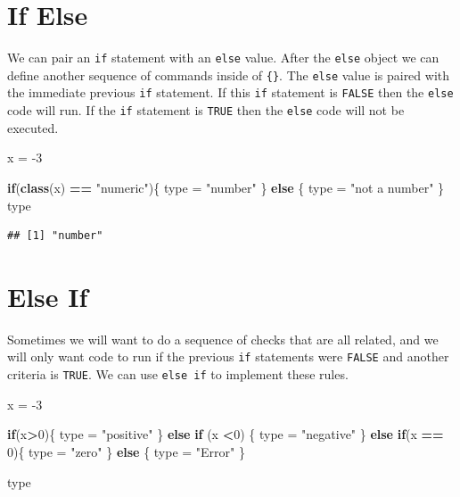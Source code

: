 \documentclass[
]{book}
\newenvironment{Shaded}{\begin{snugshade}}{\end{snugshade}}
\newcommand{\ControlFlowTok}[1]{\textcolor[rgb]{0.13,0.29,0.53}{\textbf{#1}}}
\newcommand{\DecValTok}[1]{\textcolor[rgb]{0.00,0.00,0.81}{#1}}
\newcommand{\KeywordTok}[1]{\textcolor[rgb]{0.13,0.29,0.53}{\textbf{#1}}}
\newcommand{\NormalTok}[1]{#1}
\newcommand{\OperatorTok}[1]{\textcolor[rgb]{0.81,0.36,0.00}{\textbf{#1}}}
\newcommand{\StringTok}[1]{\textcolor[rgb]{0.31,0.60,0.02}{#1}}
\begin{document}
\hypertarget{if-else}{%
\section{If Else}\label{if-else}}

We can pair an \texttt{if} statement with an \texttt{else} value. After the \texttt{else} object we can define another sequence of commands inside of \texttt{\{\}}. The \texttt{else} value is paired with the immediate previous \texttt{if} statement. If this \texttt{if} statement is \texttt{FALSE} then the \texttt{else} code will run. If the \texttt{if} statement is \texttt{TRUE} then the \texttt{else} code will not be executed.

\begin{Shaded}
\begin{Highlighting}[]
\NormalTok{x =}\StringTok{ }\DecValTok{-3}

\ControlFlowTok{if}\NormalTok{(}\KeywordTok{class}\NormalTok{(x) }\OperatorTok{==}\StringTok{ "numeric"}\NormalTok{)\{}
\NormalTok{  type =}\StringTok{ "number"}
\NormalTok{\} }\ControlFlowTok{else}\NormalTok{ \{}
\NormalTok{  type =}\StringTok{ "not a number"}
\NormalTok{\}}
\NormalTok{type}
\end{Highlighting}
\end{Shaded}

\begin{verbatim}
## [1] "number"
\end{verbatim}

\hypertarget{else-if}{%
\section{Else If}\label{else-if}}

Sometimes we will want to do a sequence of checks that are all related, and we will only want code to run if the previous \texttt{if} statements were \texttt{FALSE} and another criteria is \texttt{TRUE}. We can use \texttt{else\ if} to implement these rules.

\begin{Shaded}
\begin{Highlighting}[]
\NormalTok{x =}\StringTok{ }\DecValTok{-3}


\ControlFlowTok{if}\NormalTok{(x}\OperatorTok{>}\DecValTok{0}\NormalTok{)\{}
\NormalTok{    type =}\StringTok{ "positive"}
\NormalTok{\} }\ControlFlowTok{else} \ControlFlowTok{if}\NormalTok{ (x }\OperatorTok{<}\DecValTok{0}\NormalTok{) \{}
\NormalTok{    type =}\StringTok{ "negative"}
\NormalTok{\} }\ControlFlowTok{else} \ControlFlowTok{if}\NormalTok{(x }\OperatorTok{==}\StringTok{ }\DecValTok{0}\NormalTok{)\{}
\NormalTok{    type =}\StringTok{ "zero"}
\NormalTok{\} }\ControlFlowTok{else}\NormalTok{ \{}
\NormalTok{    type =}\StringTok{ "Error"}
\NormalTok{\}}

\NormalTok{type }
\end{Highlighting}
\end{Shaded}
\end{document}
